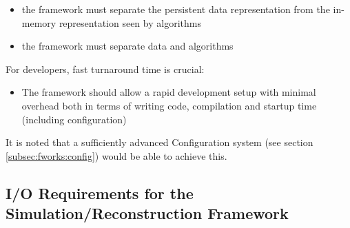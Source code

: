 \documentclass[../main-v1.tex]{subfiles}
\begin{document}
\begin{itemize}

\item the framework must separate the persistent data representation from the in-memory representation seen by algorithms

\item the framework must separate data and algorithms 
\end{itemize}

For developers, fast turnaround time is crucial:
\begin{itemize}
 \item The framework should allow a rapid development setup with minimal overhead both in terms of writing code, compilation and startup time (including configuration)


\end{itemize}

It is noted that a sufficiently advanced Configuration system (see section \ref{subsec:fworks:config}) would be able to achieve this.


\subsection{I/O Requirements for the Simulation/Reconstruction Framework}



\end{document}
